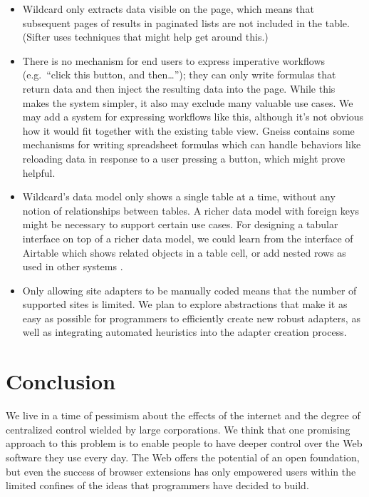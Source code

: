 \documentclass[english,submission]{programming}
\providecommand{\tightlist}{%
  \setlength{\itemsep}{0pt}\setlength{\parskip}{0pt}}
\begin{document}
\begin{itemize}
\tightlist
\item
  Wildcard only extracts data visible on the page, which means that
  subsequent pages of results in paginated lists are not included in the
  table. (Sifter \autocite{huynh2006} uses techniques that might help
  get around this.)
\item
  There is no mechanism for end users to express imperative workflows
  (e.g.~``click this button, and then\ldots{}''); they can only write
  formulas that return data and then inject the resulting data into the
  page. While this makes the system simpler, it also may exclude many
  valuable use cases. We may add a system for expressing workflows like
  this, although it's not obvious how it would fit together with the
  existing table view. Gneiss \autocite{chang2014} contains some
  mechanisms for writing spreadsheet formulas which can handle behaviors
  like reloading data in response to a user pressing a button, which
  might prove helpful.
\item
  Wildcard's data model only shows a single table at a time, without any
  notion of relationships between tables. A richer data model with
  foreign keys might be necessary to support certain use cases. For
  designing a tabular interface on top of a richer data model, we could
  learn from the interface of Airtable which shows related objects in a
  table cell, or add nested rows as used in other systems
  \autocite{mccutchen2016,bakke2016}.
\item
  Only allowing site adapters to be manually coded means that the number
  of supported sites is limited. We plan to explore abstractions that
  make it as easy as possible for programmers to efficiently create new
  robust adapters, as well as integrating automated heuristics into the
  adapter creation process.
\end{itemize}

\hypertarget{conclusion}{%
\section{Conclusion}\label{conclusion}}

We live in a time of pessimism about the effects of the internet and the
degree of centralized control wielded by large corporations. We think
that one promising approach to this problem is to enable people to have
deeper control over the Web software they use every day. The Web offers
the potential of an open foundation, but even the success of browser
extensions has only empowered users within the limited confines of the
ideas that programmers have decided to build.
\end{document}
